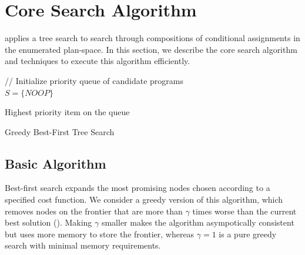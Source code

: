 \section{Core Search Algorithm}
\sys applies a tree search to search through compositions of conditional assignments in the enumerated plan-space. In this section, we describe the core search algorithm and techniques to execute this algorithm efficiently.

{
\begin{algorithm}[t]

// Initialize priority queue of candidate programs\\
$S = \{NOOP\}$



\Return Highest priority item on the queue
\caption{Greedy Best-First Tree Search}
\label{alg:main}
\end{algorithm}
}

\subsection{Basic Algorithm}
Best-first search expands the most promising nodes chosen according to a specified cost function.
We consider a greedy version of this algorithm, which removes nodes on the frontier that are more than $\gamma$ times worse than the current best solution ().
Making $\gamma$ smaller makes the algorithm asympotically consistent but uses more memory to store the frontier, whereas $\gamma=1$ is a pure greedy search with minimal memory requirements.  

